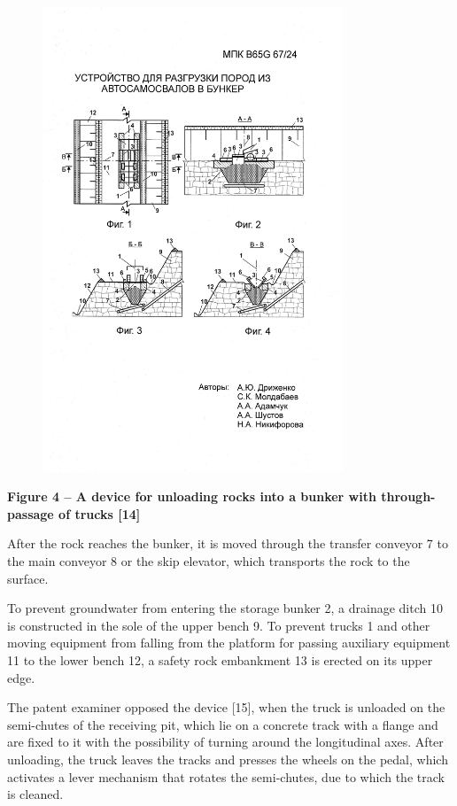 \begin{figure}[H]
	\centering
	\includegraphics[width=0.8\textwidth]{assets/1354}
	\caption*{}
\end{figure}

{\bfseries Figure 4 -- A device for unloading rocks into a bunker with
through-passage of trucks {[}14{]}}

After the rock reaches the bunker, it is moved through the transfer
conveyor 7 to the main conveyor 8 or the skip elevator, which transports
the rock to the surface.

To prevent groundwater from entering the storage bunker 2, a drainage
ditch 10 is constructed in the sole of the upper bench 9. To prevent
trucks 1 and other moving equipment from falling from the platform for
passing auxiliary equipment 11 to the lower bench 12, a safety rock
embankment 13 is erected on its upper edge.

The patent examiner opposed the device {[}15{]}, when the truck is
unloaded on the semi-chutes of the receiving pit, which lie on a
concrete track with a flange and are fixed to it with the possibility of
turning around the longitudinal axes. After unloading, the truck leaves
the tracks and presses the wheels on the pedal, which activates a lever
mechanism that rotates the semi-chutes, due to which the track is
cleaned.

